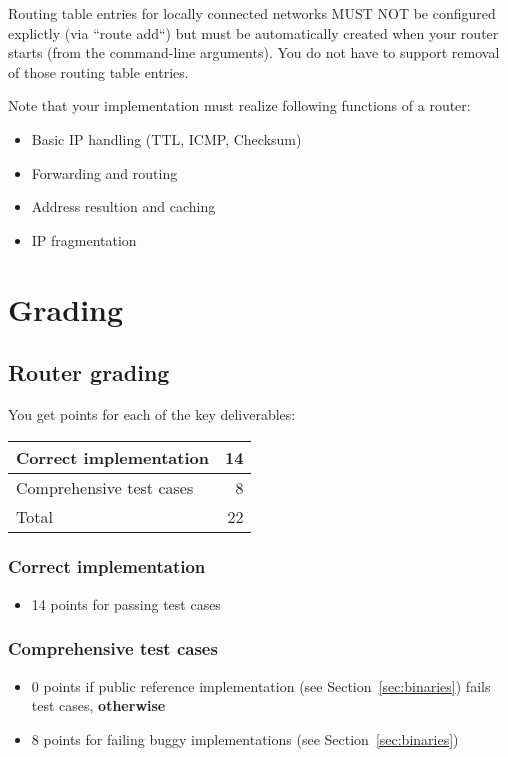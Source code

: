 \documentclass{article}
\begin{document}
Routing table entries for locally connected networks MUST NOT be
configured explictly (via ``route add``) but must be automatically
created when your router starts (from the command-line arguments). You
do not have to support removal of those routing table entries.


Note that your implementation must realize following functions of a
router:

\begin{itemize}
\item Basic IP handling (TTL, ICMP, Checksum) %
\item Forwarding and routing %
\item Address resultion and caching %
\item IP fragmentation %
\end{itemize}




\section{Grading}



\subsection{Router grading}

You get points for each of the key deliverables:
\begin{center}
\begin{tabular}{l|r}
Correct implementation                    & 14 \\ \hline
Comprehensive test cases                  &  8 \\ \hline \hline
Total                                     & 22
\end{tabular}
\end{center}


\subsubsection{Correct implementation}
\begin{itemize}
\item 14 points for passing test cases
\end{itemize}

\subsubsection{Comprehensive test cases}
\begin{itemize}
\item 0 points if public reference implementation (see Section~\ref{sec:binaries})
      fails test cases, {\bf otherwise}
\item 8 points for failing buggy implementations (see Section~\ref{sec:binaries})
\end{itemize}
\end{document}
